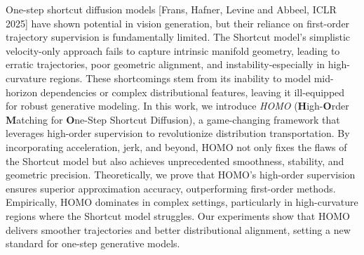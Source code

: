 One-step shortcut diffusion models [Frans, Hafner, Levine and Abbeel, ICLR 2025] have shown potential in vision generation, but their reliance on first-order trajectory supervision is fundamentally limited. The Shortcut model's simplistic velocity-only approach fails to capture intrinsic manifold geometry, leading to erratic trajectories, poor geometric alignment, and instability-especially in high-curvature regions. These shortcomings stem from its inability to model mid-horizon dependencies or complex distributional features, leaving it ill-equipped for robust generative modeling.
In this work, we introduce \textit{HOMO} (\textbf{H}igh-\textbf{O}rder \textbf{M}atching for \textbf{O}ne-Step Shortcut Diffusion), a game-changing framework that leverages high-order supervision to revolutionize distribution transportation. By incorporating acceleration, jerk, and beyond, HOMO not only fixes the flaws of the Shortcut model but also achieves unprecedented smoothness, stability, and geometric precision. Theoretically, we prove that HOMO's high-order supervision ensures superior approximation accuracy, outperforming first-order methods.
Empirically, HOMO dominates in complex settings, particularly in high-curvature regions where the Shortcut model struggles. Our experiments show that HOMO delivers smoother trajectories and better distributional alignment, setting a new standard for one-step generative models. 